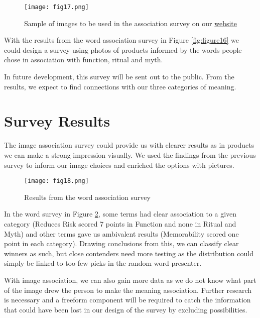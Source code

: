 \documentclass[12pt, usenames, dvipsnames]{report}
\begin{document}
\begin{flushleft}
\vspace*{1.2em}
\begin{figure}[!htbp]
  \hspace*{-3.666em}
  \texttt{[image: fig17.png]}
  \caption{Sample of images to be used in the association survey on our \href{https://meaning.pub}{website}}
  \label{fig:figure17}
\end{figure}
\vspace*{1.2em}

With the results from the word association survey in Figure \ref{fig:figure16} we could design a survey using photos of products informed by the words people chose in association with function, ritual and myth.

In future development, this survey will be sent out to the public.
From the results, we expect to find connections with our three categories of meaning.


\section{Survey Results}

The image association survey could provide us with clearer results as in products we can make a strong impression visually.
We used the findings from the previous survey to inform our image choices and enriched the options with pictures.

\vspace*{1.2em}
\begin{figure}[!htbp]
  \hspace*{-3.666em}
  \texttt{[image: fig18.png]}
  \caption{Results from the word association survey}
  \label{fig:figure18}
\end{figure}
\vspace*{1.2em} 

In the word survey in Figure \ref{fig:figure18}, some terms had clear association to a given category (Reduces Risk scored 7 points in Function and none in Ritual and Myth) and other terms gave us ambivalent results (Memorability scored one point in each category).
Drawing conclusions from this, we can classify clear winners as such, but close contenders need more testing as the distribution could simply be linked to too few picks in the random word presenter.

With image association, we can also gain more data as we do not know what part of the image drew the person to make the meaning association. 
Further research is necessary and a freeform component will be required to catch the information that could have been lost in our design of the survey by excluding possibilities.


\end{flushleft}
\end{document}
